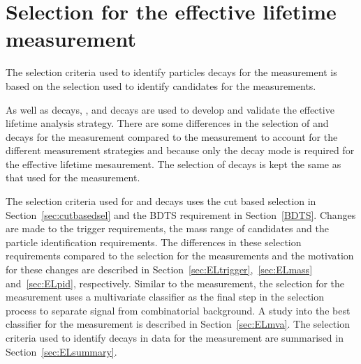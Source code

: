 \clearpage
\section[Selection for the \bsmumu effective lifetime measurement]{Selection for the \boldmath{\bsmumu} effective lifetime measurement}
\label{sec:ELsel}



The selection criteria used to identify particles decays for the \bsmumu \el measurement is based on the selection used to identify candidates for the \BF measurements. 

As well as \bsmumu decays, \bdkpi, \bskk and \bsjpsiphi decays are used to develop and validate the effective lifetime analysis strategy. There are some differences in the selection of \bsmumu and \bhh decays for the \el measurement compared to the \BF measurement to account for the different measurement strategies and because only the \bs decay mode is required for the effective lifetime mesaurement. The selection of \bsjpsiphi decays is kept the same as that used for the \BF measurement.


The selection criteria used for \bsmumu and \bhh decays uses the cut based selection in Section~\ref{sec:cutbasedsel} and the BDTS requirement in Section~\ref{BDTS}. Changes are made to the trigger requirements, the mass range of candidates and the particle identification requirements. The differences in these selection requirements compared to the selection for the \BF measurements and the motivation for these changes are described in Section~\ref{sec:ELtrigger},~\ref{sec:ELmass} and~\ref{sec:ELpid}, respectively. 
Similar to the \BF measurement, the selection for the \el measurement uses a multivariate classifier as the final step in the selection process to separate signal from combinatorial background. A study into the best classifier for the \el measurement is described in Section~\ref{sec:ELmva}.
The selection criteria used to identify decays in data for the \bsmumu \el measurement are summarised in Section~\ref{sec:ELsummary}. 

